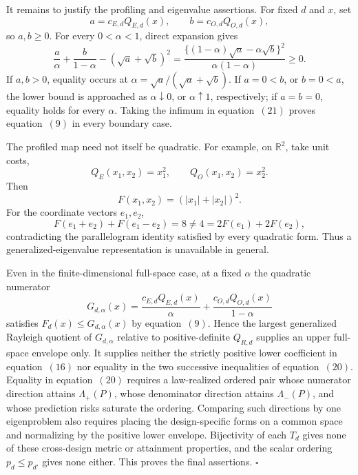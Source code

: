 It remains to justify the profiling and eigenvalue assertions.  For fixed \(d\) and \(x\), set
\[
 a=c_{E,d}Q_{E,d}(x),\qquad b=c_{O,d}Q_{O,d}(x),
\]
so \(a,b\ge0\).  For every \(0<\alpha<1\), direct expansion gives
\[
 \frac a\alpha+\frac b{1-\alpha}-(\sqrt a+\sqrt b)^2
 =\frac{\{(1-\alpha)\sqrt a-\alpha\sqrt b\}^2}
        {\alpha(1-\alpha)}\ge0.                           \tag{21}
\]
If \(a,b>0\), equality occurs at
\(
 \alpha=\sqrt a/(\sqrt a+\sqrt b)
\).
If \(a=0<b\), or \(b=0<a\), the lower bound is approached as \(\alpha\downarrow0\), or \(\alpha\uparrow1\), respectively; if \(a=b=0\), equality holds for every \(\alpha\).  Taking the infimum in equation~\((21)\) proves equation~\((9)\) in every boundary case.

The profiled map need not itself be quadratic.  For example, on \(\mathbb R^2\), take unit costs,
\[
 Q_E(x_1,x_2)=x_1^2,
 \qquad Q_O(x_1,x_2)=x_2^2.
\]
Then
\[
 F(x_1,x_2)=(|x_1|+|x_2|)^2.
\]
For the coordinate vectors \(e_1,e_2\),
\[
 F(e_1+e_2)+F(e_1-e_2)=8
 \ne4=2F(e_1)+2F(e_2),                                   \tag{22}
\]
contradicting the parallelogram identity satisfied by every quadratic form.  Thus a generalized-eigenvalue representation is unavailable in general.

Even in the finite-dimensional full-space case, at a fixed \(\alpha\) the quadratic numerator
\[
 G_{d,\alpha}(x)=
 \frac{c_{E,d}Q_{E,d}(x)}\alpha+
 \frac{c_{O,d}Q_{O,d}(x)}{1-\alpha}
\]
satisfies \(F_d(x)\le G_{d,\alpha}(x)\) by equation~\((9)\).  Hence the largest generalized Rayleigh quotient of \(G_{d,\alpha}\) relative to positive-definite \(Q_{R,d}\) supplies an upper full-space envelope only.  It supplies neither the strictly positive lower coefficient in equation~\((16)\) nor equality in the two successive inequalities of equation~\((20)\).  Equality in equation~\((20)\) requires a law-realized ordered pair whose numerator direction attains \(\Lambda_+(P)\), whose denominator direction attains \(\Lambda_-(P)\), and whose prediction risks saturate the ordering.  Comparing such directions by one eigenproblem also requires placing the design-specific forms on a common space and normalizing by the positive lower envelope.  Bijectivity of each \(T_d\) gives none of these cross-design metric or attainment properties, and the scalar ordering \(p_d\le p_{d'}\) gives none either.  This proves the final assertions. \(\square\)